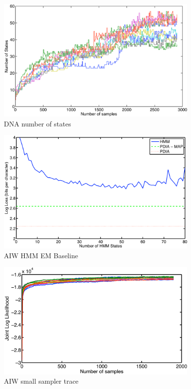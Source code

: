 \begin{figure}[htbp]
\begin{center}
\includegraphics[width=10cm]{results/dna_numstates}
\caption{DNA number of states}
\label{fig:dna_numstates}
\end{center}
\end{figure}

\begin{figure}[htbp]
\begin{center}
\includegraphics[width=10cm]{results/aiw_small_hmm}
\caption{AIW HMM EM Baseline}
\label{fig:aiw_small_hmm}
\end{center}
\end{figure}

\begin{figure}[htbp]
\begin{center}
\includegraphics[width=10cm]{results/aiw_small_sampler}
\caption{AIW small sampler trace }
\label{fig:aiw_small_sampler}
\end{center}
\end{figure}

